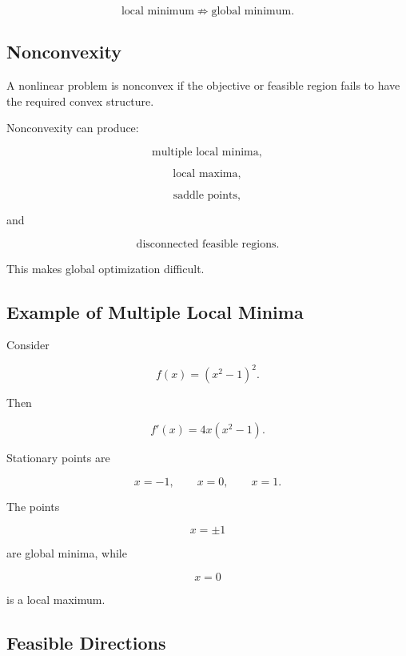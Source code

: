 \[
\boxed{
\text{local minimum}
\not\Rightarrow
\text{global minimum}.
}
\]

\subsection{Nonconvexity}
\label{subsec:nlp-nonconvexity}

A nonlinear problem is nonconvex if the objective or feasible region fails
to have the required convex structure.

Nonconvexity can produce:

\[
\boxed{
\text{multiple local minima},
}
\]

\[
\boxed{
\text{local maxima},
}
\]

\[
\boxed{
\text{saddle points},
}
\]

and

\[
\boxed{
\text{disconnected feasible regions}.
}
\]

This makes global optimization difficult.

\subsection{Example of Multiple Local Minima}
\label{subsec:nlp-multiple-local-minima}

Consider

\[
\boxed{
f(x)
=
(x^2-1)^2.
}
\]

Then

\[
f'(x)
=
4x(x^2-1).
\]

Stationary points are

\[
x=-1,
\qquad
x=0,
\qquad
x=1.
\]

The points

\[
\boxed{
x=\pm1
}
\]

are global minima, while

\[
\boxed{
x=0
}
\]

is a local maximum.

\subsection{Feasible Directions}
\label{subsec:nlp-feasible-directions}

